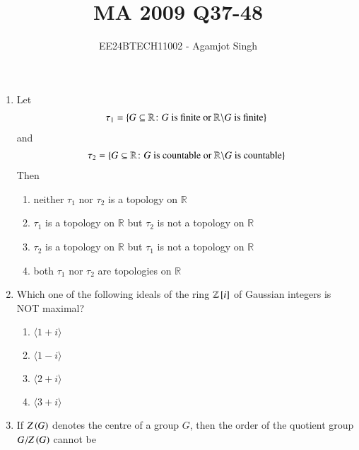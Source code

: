 \documentclass[journal,onecolumn]{IEEEtran}
\theoremstyle{remark}
\begin{document}

\vspace{3cm}

\title{MA 2009 Q37-48}
\author{EE24BTECH11002 - Agamjot Singh}
\maketitle

\renewcommand{\thefigure}{\theenumi}
\renewcommand{\thetable}{\theenumi}

\begin{enumerate}
    \item Let
	\begin{align*}
		\tau_1 = \left\{G \subseteq \mathbb{R} \colon G \text{ is finite or } \mathbb{R} \backslash G \text{ is finite}\right\}	
	\end{align*} 
	and
	\begin{align*}
		\tau_2 = \left\{G \subseteq \mathbb{R} \colon G \text{ is countable or } \mathbb{R} \backslash G \text{ is countable}\right\}	
	\end{align*}
	Then
	\hfill{}

	\begin{enumerate}
		\item neither $\tau_1$ nor $\tau_2$ is a topology on $\mathbb{R}$
		\item $\tau_1$ is a topology on $\mathbb{R}$ but $\tau_2$ is not a topology on $\mathbb{R}$
		\item $\tau_2$ is a topology on $\mathbb{R}$ but $\tau_1$ is not a topology on $\mathbb{R}$
		\item both $\tau_1$ nor $\tau_2$ are topologies on $\mathbb{R}$
	\end{enumerate}

    \item Which one of the following ideals of the ring $\mathbb{Z}{}\left[i\right]$ of Gaussian integers is NOT maximal?
	\hfill{}

	\begin{enumerate}
		\item $\langle 1 + i \rangle$
		\item $\langle 1 - i \rangle$
		\item $\langle 2 + i \rangle$
		\item $\langle 3 + i \rangle$
	\end{enumerate}

    \item If $Z\left(G\right)$ denotes the centre of a group $G$, then the order of the quotient group $G/Z\left(G\right)$ cannot be
	\hfill{}


\end{enumerate}
\end{document}
